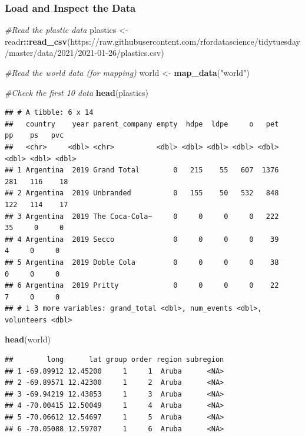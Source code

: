 \documentclass[
]{article}
\newenvironment{Shaded}{\begin{snugshade}}{\end{snugshade}}
\newcommand{\CommentTok}[1]{\textcolor[rgb]{0.56,0.35,0.01}{\textit{#1}}}
\newcommand{\FunctionTok}[1]{\textcolor[rgb]{0.13,0.29,0.53}{\textbf{#1}}}
\newcommand{\NormalTok}[1]{#1}
\newcommand{\OtherTok}[1]{\textcolor[rgb]{0.56,0.35,0.01}{#1}}
\newcommand{\SpecialCharTok}[1]{\textcolor[rgb]{0.81,0.36,0.00}{\textbf{#1}}}
\newcommand{\StringTok}[1]{\textcolor[rgb]{0.31,0.60,0.02}{#1}}
\begin{document}
\hypertarget{load-and-inspect-the-data}{%
\subsubsection{Load and Inspect the
Data}\label{load-and-inspect-the-data}}

\begin{Shaded}
\begin{Highlighting}[]
\CommentTok{\#Read the plastic data}
\NormalTok{plastics }\OtherTok{\textless{}{-}}\NormalTok{ readr}\SpecialCharTok{::}\FunctionTok{read\_csv}\NormalTok{(}\StringTok{\textquotesingle{}https://raw.githubusercontent.com/rfordatascience/tidytuesday/master/data/2021/2021{-}01{-}26/plastics.csv\textquotesingle{}}\NormalTok{)}

\CommentTok{\#Read the world data (for mapping)}
\NormalTok{world }\OtherTok{\textless{}{-}} \FunctionTok{map\_data}\NormalTok{(}\StringTok{"world"}\NormalTok{)}

\CommentTok{\#Check the first 10 data}
\FunctionTok{head}\NormalTok{(plastics)}
\end{Highlighting}
\end{Shaded}

\begin{verbatim}
## # A tibble: 6 x 14
##   country    year parent_company empty  hdpe  ldpe     o   pet    pp    ps   pvc
##   <chr>     <dbl> <chr>          <dbl> <dbl> <dbl> <dbl> <dbl> <dbl> <dbl> <dbl>
## 1 Argentina  2019 Grand Total        0   215    55   607  1376   281   116    18
## 2 Argentina  2019 Unbranded          0   155    50   532   848   122   114    17
## 3 Argentina  2019 The Coca-Cola~     0     0     0     0   222    35     0     0
## 4 Argentina  2019 Secco              0     0     0     0    39     4     0     0
## 5 Argentina  2019 Doble Cola         0     0     0     0    38     0     0     0
## 6 Argentina  2019 Pritty             0     0     0     0    22     7     0     0
## # i 3 more variables: grand_total <dbl>, num_events <dbl>, volunteers <dbl>
\end{verbatim}

\begin{Shaded}
\begin{Highlighting}[]
\FunctionTok{head}\NormalTok{(world)}
\end{Highlighting}
\end{Shaded}

\begin{verbatim}
##        long      lat group order region subregion
## 1 -69.89912 12.45200     1     1  Aruba      <NA>
## 2 -69.89571 12.42300     1     2  Aruba      <NA>
## 3 -69.94219 12.43853     1     3  Aruba      <NA>
## 4 -70.00415 12.50049     1     4  Aruba      <NA>
## 5 -70.06612 12.54697     1     5  Aruba      <NA>
## 6 -70.05088 12.59707     1     6  Aruba      <NA>
\end{verbatim}
\end{document}
